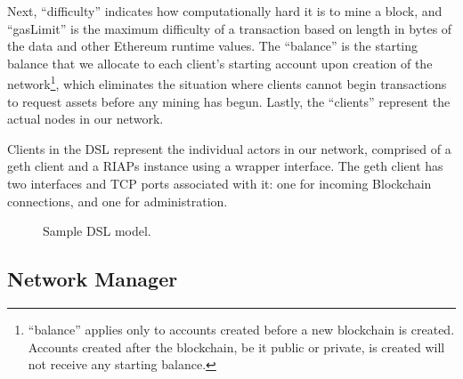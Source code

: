 Next, ``difficulty'' indicates how computationally hard it is to mine a block, and ``gasLimit'' is the maximum difficulty of a transaction based on length in bytes of the data and other Ethereum runtime values. The ``balance'' is the starting balance that we allocate to each client's starting account upon creation of the network\footnote{``balance'' applies only to accounts created before a new blockchain is created. Accounts created after the blockchain, be it public or private, is created will not receive any starting balance.}, which eliminates the situation where clients cannot begin transactions to request assets before any mining has begun. Lastly, the ``clients'' represent the actual nodes in our network. 

Clients in the DSL represent the individual actors in our network, comprised of a geth client and a RIAPs instance using a wrapper interface. The geth client has two interfaces and TCP ports associated with it: one for incoming Blockchain connections, and one for administration. 

\begin{figure}[t]

\vspace{-0.12in}
\caption{Sample DSL model.}
\label{fig:model-sample}
\vspace{-0.15in}
\end{figure}

\subsection{Network Manager}
\label{networkmanager}

